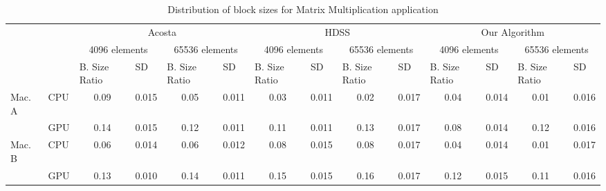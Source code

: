 \documentclass[journal]{IEEEtran}
\begin{document}
\begin{table}[htb]
\centering
\caption{Distribution of block sizes for Matrix Multiplication application}
\begin{scriptsize}
\begin{tabular}{|l|l|l|l|l|l|l|l|l|l|l|l|l|l|}
\cline{3-14}
\multicolumn{1}{l}{} &  & \multicolumn{4}{c|}{Acosta} & \multicolumn{4}{c|}{HDSS} & \multicolumn{4}{c|}{Our Algorithm} \\ 
\cline{3-14}
\multicolumn{1}{l}{} &  & \multicolumn{2}{c|}{4096 elements} & \multicolumn{2}{c|}{65536 elements} & \multicolumn{2}{c|}{4096 elements} & \multicolumn{2}{c|}{65536 elements} & \multicolumn{2}{c|}{4096 elements} & \multicolumn{2}{c|}{65536 elements} \\ 
\cline{3-14}
\multicolumn{1}{l}{} &  & B. Size Ratio & SD & B. Size Ratio & SD & B. Size Ratio & SD & B. Size Ratio & SD & B. Size Ratio & SD & B. Size Ratio & SD \\ 
\hline
Mac. A & CPU & \multicolumn{1}{c|}{0.09} & \multicolumn{1}{c|}{0.015} & \multicolumn{1}{c|}{0.05} & \multicolumn{1}{c|}{0.011} & \multicolumn{1}{c|}{0.03} & \multicolumn{1}{c|}{0.011} & \multicolumn{1}{c|}{0.02} & \multicolumn{1}{c|}{0.017} & \multicolumn{1}{c|}{0.04} & \multicolumn{1}{c|}{0.014} & \multicolumn{1}{c|}{0.01} & \multicolumn{1}{c|}{0.016} \\ 
\cline{2-14}
 & GPU & \multicolumn{1}{c|}{0.14} & \multicolumn{1}{c|}{0.015} & \multicolumn{1}{c|}{0.12} & \multicolumn{1}{c|}{0.011} & \multicolumn{1}{c|}{0.11} & \multicolumn{1}{c|}{0.011} & \multicolumn{1}{c|}{0.13} & \multicolumn{1}{c|}{0.017} & \multicolumn{1}{c|}{0.08} & \multicolumn{1}{c|}{0.014} & \multicolumn{1}{c|}{0.12} & \multicolumn{1}{c|}{0.016} \\ 
\hline
Mac. B & CPU & \multicolumn{1}{c|}{0.06} & \multicolumn{1}{c|}{0.014} & \multicolumn{1}{c|}{0.06} & \multicolumn{1}{c|}{0.012} & \multicolumn{1}{c|}{0.08} & \multicolumn{1}{c|}{0.015} & \multicolumn{1}{c|}{0.08} & \multicolumn{1}{c|}{0.017} & \multicolumn{1}{c|}{0.04} & \multicolumn{1}{c|}{0.014} & \multicolumn{1}{c|}{0.01} & \multicolumn{1}{c|}{0.017} \\ 
\cline{2-14}
 & GPU & \multicolumn{1}{c|}{0.13} & \multicolumn{1}{c|}{0.010} & \multicolumn{1}{c|}{0.14} & \multicolumn{1}{c|}{0.011} & \multicolumn{1}{c|}{0.15} & \multicolumn{1}{c|}{0.015} & \multicolumn{1}{c|}{0.16} & \multicolumn{1}{c|}{0.017} & \multicolumn{1}{c|}{0.12} & \multicolumn{1}{c|}{0.015} & \multicolumn{1}{c|}{0.11} & \multicolumn{1}{c|}{0.016} \\ 

\end{tabular}
\end{scriptsize}
\end{table}
\end{document}

